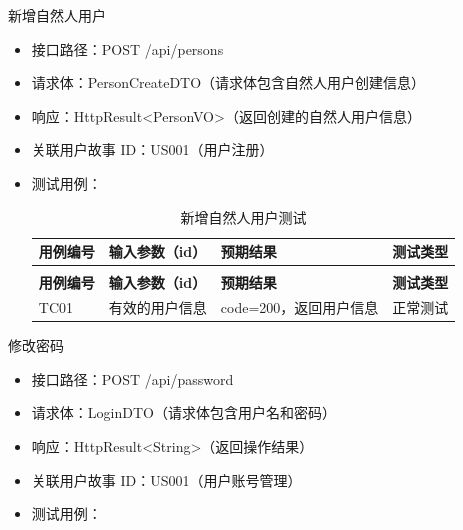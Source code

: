 \begin{levellist}
\begin{levellist}
        \item 新增自然人用户
        \begin{itemize}
            \item 接口路径：POST /api/persons
            \item 请求体：PersonCreateDTO（请求体包含自然人用户创建信息）
            \item 响应：HttpResult<PersonVO>（返回创建的自然人用户信息）
            \item 关联用户故事 ID：US001（用户注册）
            \item 测试用例：
                  \begin{longtable}{>{\centering\arraybackslash}m{2cm} >{\centering\arraybackslash}m{4cm} >{\centering\arraybackslash}m{5cm} >{\centering\arraybackslash}m{2cm}}

                      \caption{新增自然人用户测试} \label{tab:training}                            \\

                      \toprule
                      \textbf{用例编号} & \textbf{输入参数（id）} & \textbf{预期结果}   & \textbf{测试类型} \\
                      \midrule
                      \endfirsthead

                      \multicolumn{4}{c}{{\tablename\ \thetable{} 续表}}                    \\
                      \toprule
                      \textbf{用例编号} & \textbf{输入参数（id）} & \textbf{预期结果}   & \textbf{测试类型} \\
                      \midrule
                      \endhead

                      \bottomrule
                      \endfoot

                      TC01          & 有效的用户信息           & code=200，返回用户信息 & 正常测试          \\
                  \end{longtable}
        \end{itemize}


        \item 修改密码
        \begin{itemize}
            \item 接口路径：POST /api/password
            \item 请求体：LoginDTO（请求体包含用户名和密码）
            \item 响应：HttpResult<String>（返回操作结果）
            \item 关联用户故事 ID：US001（用户账号管理）
            \item 测试用例：
                  \begin{longtable}{>{\centering\arraybackslash}m{1.7cm} >{\centering\arraybackslash}m{4cm} >{\centering\arraybackslash}m{5.5cm} >{\centering\arraybackslash}m{1.8cm}}


\end{longtable}
\end{itemize}
\end{levellist}
\end{levellist}
